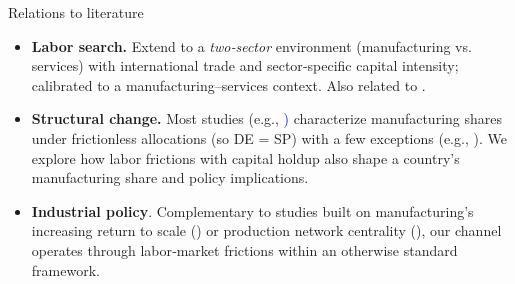 \documentclass[9pt,xcolor={svgnames}]{beamer}
\begin{document}
\begin{frame}{Relations to literature}

\begin{itemize}
    \item \textbf{Labor search.}   Extend \textcolor{blue}{\cite{acemoglu1999holdups}} to a \emph{two‐sector} environment (manufacturing vs. services) with international trade and sector‐specific capital intensity; calibrated to a manufacturing–services context. Also related to \textcolor{blue}{\cite{cardullo2015sunk}}.

    \medskip

    \item \textbf{Structural change.} Most studies (e.g., \textcolor{blue}{\cite{Rodrik2016, huneeus2024heterogeneous})}  characterize manufacturing shares under frictionless allocations (so DE = SP) with a few exceptions (e.g., \textcolor{blue}{\cite{feng2024unemployment}}).  We explore how labor frictions with capital holdup also shape a country's manufacturing share and policy implications.

\medskip

    \item \textbf{Industrial policy}.  Complementary to studies built on manufacturing's increasing return to scale (\textcolor{blue}{\cite{matsuyama1991increasing}}) or production network centrality (\textcolor{blue}{\cite{liu2019industrial}}), our channel operates through labor‐market frictions within an otherwise standard framework.
\end{itemize}

\end{frame}
\end{document}
